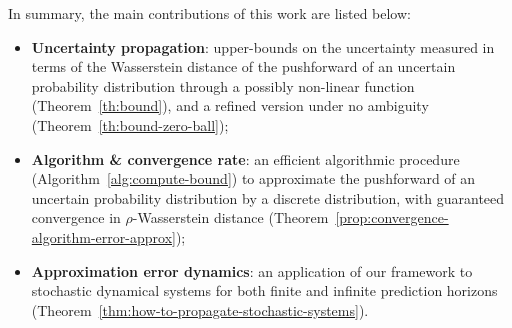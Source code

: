 \documentclass[11pt, a4paper, oneside,reqno]{amsart}
\theoremstyle{plain}
\begin{document}
In summary, the main contributions of this work are listed below:
\begin{itemize}
    \item {\bf Uncertainty propagation}: upper-bounds on the uncertainty measured in terms of the Wasserstein distance of the pushforward of an uncertain probability distribution through a possibly non-linear function (Theorem~\ref{th:bound}), and a refined version under no ambiguity (Theorem~\ref{th:bound-zero-ball});
    \item {\bf Algorithm \& convergence rate}: an efficient algorithmic procedure (Algorithm~\ref{alg:compute-bound}) to approximate the pushforward of an uncertain probability distribution by a discrete distribution, with guaranteed convergence in \(\rho\)-Wasserstein distance (Theorem~\ref{prop:convergence-algorithm-error-approx});
    \item {\bf Approximation error dynamics}: an application of our framework to stochastic dynamical systems for both finite and infinite prediction horizons (Theorem~\ref{thm:how-to-propagate-stochastic-systems}).
\end{itemize}
\end{document}
